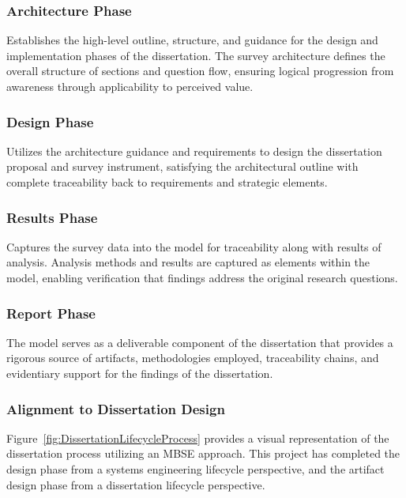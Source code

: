 \subsubsection{Architecture Phase}

Establishes the high-level outline, structure, and guidance for the design and implementation phases of the dissertation. The survey architecture defines the overall structure of sections and question flow, ensuring logical progression from awareness through applicability to perceived value.

\subsubsection{Design Phase}

Utilizes the architecture guidance and requirements to design the dissertation proposal and survey instrument, satisfying the architectural outline with complete traceability back to requirements and strategic elements.

\subsubsection{Results Phase}

Captures the survey data into the model for traceability along with results of analysis. Analysis methods and results are captured as elements within the model, enabling verification that findings address the original research questions.

\subsubsection{Report Phase}

The model serves as a deliverable component of the dissertation that provides a rigorous source of artifacts, methodologies employed, traceability chains, and evidentiary support for the findings of the dissertation.

\subsubsection{Alignment to Dissertation Design}

Figure~\ref{fig:DissertationLifecycleProcess} provides a visual representation of the dissertation process utilizing an MBSE approach. This project has completed the design phase from a systems engineering lifecycle perspective, and the artifact design phase from a dissertation lifecycle perspective.

